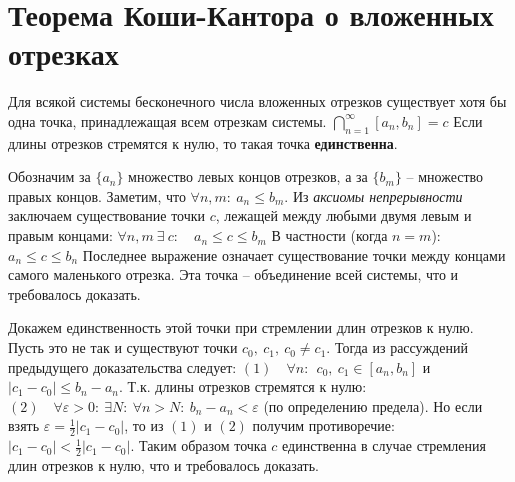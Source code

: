 \section[Т. о влож. отрезках]{Теорема Коши-Кантора о вложенных отрезках}
\begin{theorem}
Для всякой системы бесконечного числа вложенных отрезков существует хотя бы одна точка, 
принадлежащая всем отрезкам системы.\newline
$\bigcap\limits_{n=1}^{\infty} [a_n, b_n] = c$\newline
Если длины отрезков стремятся к нулю, то такая точка \textbf{единственна}.
\end{theorem}
Обозначим за $\{ a_n\}$ множество левых концов отрезков, а за $\{ b_m \}$ -- множество правых 
концов.
Заметим, что $\forall n, m:\ a_n \leq b_m$. Из \textit{аксиомы непрерывности} заключаем 
существование точки $c$, лежащей между любыми двумя левым и правым концами:\newline
$\forall n, m\ \exists\  c: \quad a_n \leq c \leq b_m$\newline
В частности (когда $n = m$): $a_n \leq c \leq b_n$\newline 
Последнее выражение означает существование точки между концами самого маленького отрезка. Эта точка 
-- объединение всей системы, что и требовалось доказать.\newline\newline

Докажем единственность этой точки при стремлении длин отрезков к нулю.\newline
Пусть это не так и существуют точки $c_0,\ c_1,\ c_0 \neq c_1$. Тогда из рассуждений предыдущего 
доказательства следует:\newline
$(1) \quad \forall n:\ \ c_0,\ c_1 \in [a_n, b_n]$ и $|c_1 - c_0| \leq b_n - a_n$.
Т.к. длины отрезков стремятся к нулю:\newline
$(2) \quad \forall \varepsilon > 0:\ \exists N:\ \forall n > N:\ b_n - a_n < \varepsilon$ (по 
определению предела).\newline
Но если взять $\varepsilon = \frac{1}{2} |c_1 - c_0|$, то из $(1)$ и $(2)$ получим противоречие: 
$|c_1 - c_0| < \frac{1}{2} |c_1 - c_0|$.\newline
Таким образом точка $c$ единственна в случае стремления длин отрезков к нулю, что и требовалось 
доказать.

